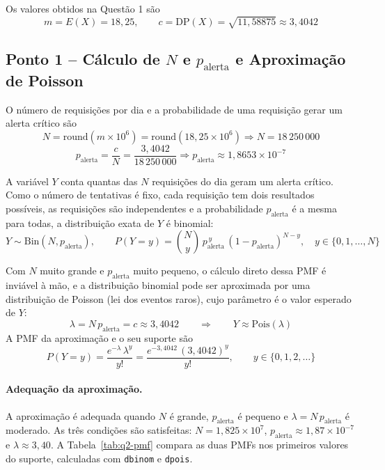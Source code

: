 \documentclass[10pt,a4paper]{article}
\begin{document}
Os valores obtidos na Questão 1 são
\[
m = E(X) = 18{,}25, \qquad c = \text{DP}(X) = \sqrt{11{,}58875} \approx 3{,}4042
\]

\subsection{Ponto 1 -- Cálculo de $N$ e $p_{\text{alerta}}$ e Aproximação de Poisson}

O número de requisições por dia e a probabilidade de uma requisição gerar um alerta crítico são
\[
N = \text{round}(m \times 10^{6}) = \text{round}(18{,}25 \times 10^{6}) \Rightarrow \boxed{N = 18\,250\,000}
\]
\[
p_{\text{alerta}} = \frac{c}{N} = \frac{3{,}4042}{18\,250\,000} \Rightarrow \boxed{p_{\text{alerta}} \approx 1{,}8653 \times 10^{-7}}
\]

A variável $Y$ conta quantas das $N$ requisições do dia geram um alerta crítico. Como o número de tentativas é fixo, cada requisição tem dois resultados possíveis, as requisições são 
independentes e a probabilidade $p_{\text{alerta}}$ é a mesma para todas, a distribuição exata de $Y$ é binomial:
\[
Y \sim \text{Bin}(N, p_{\text{alerta}}), \qquad P(Y = y) = \binom{N}{y}\, p_{\text{alerta}}^{\,y}\, (1 - p_{\text{alerta}})^{N-y}, \quad y \in \{0, 1, \dots, N\}
\]

Com $N$ muito grande e $p_{\text{alerta}}$ muito pequeno, o cálculo direto dessa PMF é inviável à mão, e a distribuição binomial pode ser aproximada por uma distribuição de Poisson 
(lei dos eventos raros), cujo parâmetro é o valor esperado de $Y$:
\[
\lambda = N\,p_{\text{alerta}} = c \approx 3{,}4042 \qquad \Rightarrow \qquad Y \approx \text{Pois}(\lambda)
\]
A PMF da aproximação e o seu suporte são
\[
\boxed{P(Y = y) = \frac{e^{-\lambda}\,\lambda^{y}}{y!} = \frac{e^{-3{,}4042}\,(3{,}4042)^{y}}{y!}}, \qquad y \in \{0, 1, 2, \dots\}
\]

\paragraph{Adequação da aproximação.} A aproximação é adequada quando $N$ é grande, $p_{\text{alerta}}$ é pequeno e $\lambda = N\,p_{\text{alerta}}$ é moderado. As três condições são 
satisfeitas: $N = 1{,}825 \times 10^{7}$, $p_{\text{alerta}} \approx 1{,}87 \times 10^{-7}$ e $\lambda \approx 3{,}40$. A Tabela~\ref{tab:q2-pmf} compara as duas PMFs nos primeiros 
valores do suporte, calculadas com \texttt{dbinom} e \texttt{dpois}.
\end{document}
